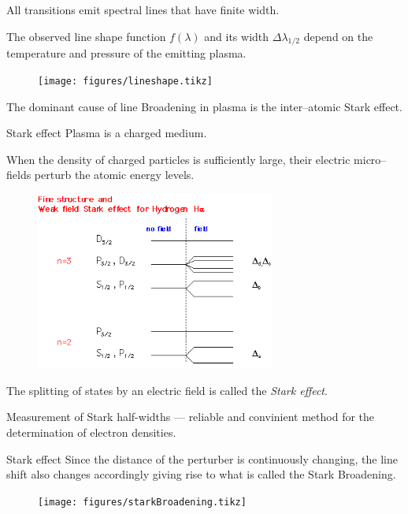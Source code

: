 \documentclass[draft]{beamer}
\begin{document}
\begin{frame}
  All transitions emit spectral lines that have finite width.
  
  The observed line shape function $f(\lambda)$ and its width $\Delta \lambda_{1/2}$ depend on the temperature and pressure of the emitting plasma.
\begin{figure}
\texttt{[image: figures/lineshape.tikz]}
\end{figure}
The dominant cause of line Broadening in plasma is the inter--atomic Stark effect.
\end{frame}
\begin{frame}{Stark effect}
  Plasma is a charged medium.

  When the density of charged particles is sufficiently large, their electric micro--fields perturb the atomic energy levels.
  \begin{figure}
      \includegraphics[width=0.7\textwidth]{figures/stark_effect_1.png}
  \end{figure}
  The splitting of states by an electric field is called the \emph{Stark effect}.

  Measurement of Stark half-widths --- reliable and convinient method for the determination of electron densities.
  \end{frame}
  \begin{frame}{Stark effect}
    Since the distance of the perturber is continuously changing, the line shift also changes accordingly giving rise to what is called the Stark Broadening.
    \begin{figure}
    \texttt{[image: figures/starkBroadening.tikz]}
    \end{figure}
  \end{frame}
\end{document}
